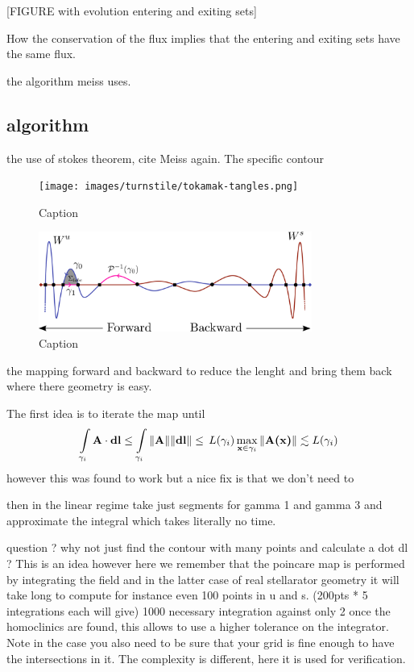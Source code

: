 [FIGURE with evolution entering and exiting sets]

How the conservation of the flux implies that the entering and exiting sets have the same flux.

the algorithm meiss uses.

\subsection{algorithm}

the use of stokes theorem, cite Meiss again.
The specific contour

\begin{figure}[H]
    \centering
    \texttt{[image: images/turnstile/tokamak-tangles.png]}
    \caption{Caption}
    \label{fig:enter-label}
\end{figure}

\begin{figure}[H]
    \centering
    \includegraphics[width=0.8\textwidth]{images/turnstile/line_tangle.png}
    \caption{Caption}
    \label{fig:enter-label}
\end{figure}

the mapping forward and backward to reduce the lenght and bring them back where there geometry is easy.

The first idea is to iterate the map until 
\begin{align*}
    \int\limits_{\gamma_i} \textbf{A}\cdot\textbf{dl} \leq \int\limits_{\gamma_i} \Vert\textbf{A}\Vert \Vert\textbf{dl}\Vert \leq\, L(\gamma_i)\max\limits_{\textbf{x} \in\gamma_i}\Vert\textbf{A(\textbf{x})}\Vert \lesssim L(\gamma_i)
\end{align*}
however this was found to work but a nice fix is that we don't need to 

then in the linear regime take just segments for gamma 1 and gamma 3 and approximate the integral which takes literally no time.

question ? why not just find the contour with many points and calculate a dot dl ? This is an idea however here we remember that the poincare map is performed by integrating the field and in the latter case of real stellarator geometry it will take long to compute for instance even 100 points in u and s. (200pts * 5 integrations each will give) 1000 necessary integration against only 2 once the homoclinics are found, this allows to use a higher tolerance on the integrator. Note in the case you also need to be sure that your grid is fine enough to have the intersections in it. The complexity is different, here it is used for verification.

